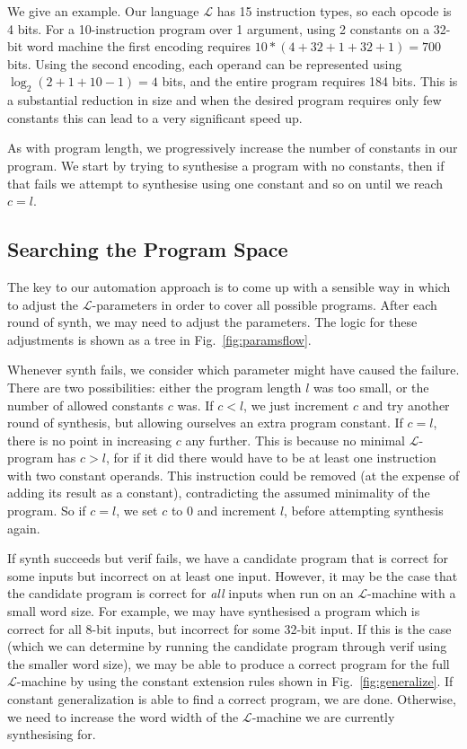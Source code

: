 \documentclass[a4paper]{llncs}
\begin{document}
We give an example. Our language $\mathcal{L}$ has 15 instruction types, so each opcode is 4 bits.
For a 10-instruction program over 1 argument, using 2 constants on a 32-bit word
machine the first encoding requires $10 * (4 + 32 + 1 + 32 + 1) = 700$ bits.
Using the second encoding, each operand can be represented using
$\log_2 (2 + 1 + 10 - 1) = 4$ bits, and the entire program requires 184 bits.
This is a substantial reduction in size and when the desired program requires
only few constants this can lead to a very significant speed up.

As with program length, we progressively increase the number of constants in
our program.  We start by trying to synthesise a program with no constants,
then if that fails we attempt to synthesise using one constant and so on until we
reach $c = l$.

\subsection{Searching the Program Space}

The key to our automation approach is to come up with a sensible way in which to
adjust the $\mathcal{L}$-parameters in order to cover all possible programs.
After each round of {\sc synth}, we may need to adjust the parameters.  The
logic for these adjustments is shown as a tree in Fig.~\ref{fig:paramsflow}.

Whenever {\sc synth} fails, we consider which parameter might have caused the
failure.  There are two possibilities: either the program length $l$ was too small,
or the number of allowed constants $c$ was.  If $c < l$, we just increment $c$ and
try another round of synthesis, but allowing ourselves an extra program constant.
If $c = l$, there is no point in increasing $c$ any further.  This is because
no minimal $\mathcal{L}$-program has $c > l$, for if it did there would
have to be at least one instruction with two constant operands.  This
instruction could be removed (at the expense of adding its result as
a constant), contradicting the assumed minimality of the program.  So
if $c = l$, we set $c$ to 0 and increment $l$, before attempting
synthesis again.

If {\sc synth} succeeds but {\sc verif} fails, we have a candidate
program that is correct for some inputs but incorrect on at least
one input.  However, it may be the case that the candidate program
is correct for \emph{all} inputs when run on an $\mathcal{L}$-machine
with a small word size.  For example, we may have synthesised a
program which is correct for all 8-bit inputs, but incorrect for
some 32-bit input.  If this is the case (which we can determine
by running the candidate program through {\sc verif} using the smaller
word size), we may be able to produce a correct program for
the full $\mathcal{L}$-machine by using the constant extension rules
shown in Fig.~\ref{fig:generalize}.  If constant generalization
is able to find a correct program, we are done.  Otherwise,
we need to increase the word width of the $\mathcal{L}$-machine
we are currently synthesising for.
\end{document}
